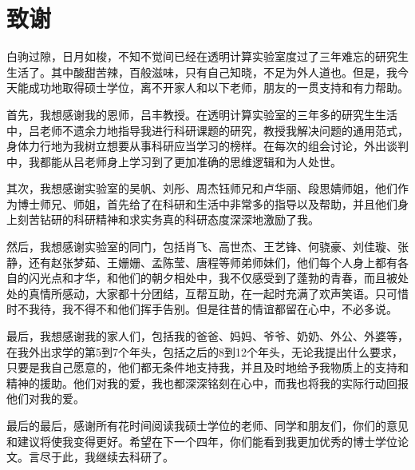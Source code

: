 \section{致谢} %
	白驹过隙，日月如梭，不知不觉间已经在透明计算实验室度过了三年难忘的研究生生活了。其中酸甜苦辣，百般滋味，只有自己知晓，不足为外人道也。但是，我今天能成功地取得硕士学位，离不开家人和以下老师，朋友的一贯支持和有力帮助。\par
	首先，我想感谢我的恩师，吕丰教授。在透明计算实验室的三年多的研究生生活中，吕老师不遗余力地指导我进行科研课题的研究，教授我解决问题的通用范式，身体力行地为我树立想要从事科研应当学习的榜样。在每次的组会讨论，外出谈判中，我都能从吕老师身上学习到了更加准确的思维逻辑和为人处世。\par
	其次，我想感谢实验室的吴帆、刘彤、周杰钰师兄和卢华丽、段思婧师姐，他们作为博士师兄、师姐，首先给了在科研和生活中非常多的指导以及帮助，并且他们身上刻苦钻研的科研精神和求实务真的科研态度深深地激励了我。\par
	然后，我想感谢实验室的同门，包括肖飞、高世杰、王艺锋、何骁豪、刘佳璇、张静，还有赵张梦茹、王姗姗、孟陈莹、唐程等师弟师妹们，他们每个人身上都有各自的闪光点和才华，和他们的朝夕相处中，我不仅感受到了蓬勃的青春，而且被处处的真情所感动，大家都十分团结，互帮互助，在一起时充满了欢声笑语。只可惜时不我待，我不得不和他们挥手告别。但是往昔的情谊都留在心中，不必多说。\par
	最后，我想感谢我的家人们，包括我的爸爸、妈妈、爷爷、奶奶、外公、外婆等，在我外出求学的第5到7个年头，包括之后的8到12个年头，无论我提出什么要求，只要是我自己愿意的，他们都无条件地支持我，并且及时地给予我物质上的支持和精神的援助。他们对我的爱，我也都深深铭刻在心中，而我也将我的实际行动回报他们对我的爱。\par
	最后的最后，感谢所有花时间阅读我硕士学位的老师、同学和朋友们，你们的意见和建议将使我变得更好。希望在下一个四年，你们能看到我更加优秀的博士学位论文。言尽于此，我继续去科研了。


\renewcommand*{\baselinestretch}{1.0} %
\setlength{\baselineskip}{20pt} %

%

\newpage
\fi
